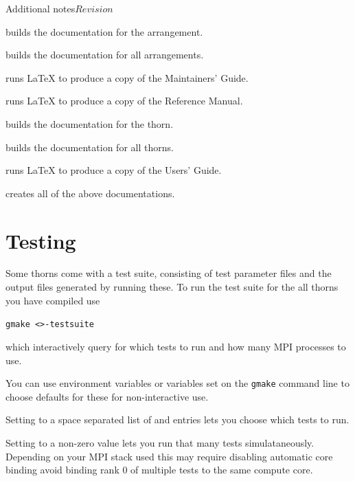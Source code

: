 \begin{cactuspart}{Additional notes}{}{$Revision$}
\begin{Lentry}

\item[\texttt{gmake <\var{arrangement}>-ArrangementDoc}] builds the
documentation for the arrangement.

\item[\texttt{gmake ArrangementDoc}] builds the documentation for all
arrangements.

\item [\texttt{gmake MaintGuide}] runs LaTeX to produce a copy of the
Maintainers' Guide.

\item [\texttt{gmake ReferenceManual}] runs LaTeX to produce a copy of the
Reference Manual.

\item[\texttt{gmake <\var{thorn}>-ThornDoc}] builds the documentation for the
thorn.

\item[\texttt{gmake ThornDoc}] builds the documentation for all thorns.

\item [\texttt{gmake UsersGuide}] runs LaTeX to produce a copy of the Users'
Guide.

\item [\texttt{gmake AllDoc}] creates all of the above documentations.

\end{Lentry}


\section{Testing}
\label{sec:testing}

Some thorns come with a test suite, consisting of test parameter files
and the output files generated by running these. To run the test suite
for the all thorns you have compiled use

\texttt{gmake <>-testsuite}

which interactively query for which tests to run and how many MPI processes
to use.

You can use environment variables or variables set on the \texttt{gmake}
command line to choose defaults for these for non-interactive use.

Setting  to a space separated list of
 and  entries lets you choose which tests to run.

Setting  to a non-zero value lets
you run that many tests simulataneously. Depending on your MPI stack
used this may require disabling automatic core binding avoid binding
rank 0 of multiple tests to the same compute core.


\end{cactuspart}
